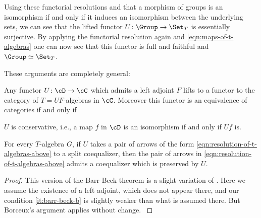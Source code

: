 \documentclass[leqno,oneside,english]{elsarticle}
\begin{document}
Using these functorial resolutions and that a morphism of groups is an
isomorphism if and only if it induces an isomorphism between the
underlying sets, we can see that the lifted functor $U\colon \Group
\rightarrow \Set_{T}$ is essentially surjective. By applying the
functorial resolution again and \eqref{eqn:maps-of-t-algebras} one can
now see that this functor is full and faithful and $\Group \simeq \Set_T$.

These arguments are completely general: 
\begin{thm}\label{thm:monadicity}
  Any functor $U\colon\cD\rightarrow \cC$ which admits a left adjoint
  $F$ lifts to a functor to the category of $T=UF$-algebras in $\cC$.
  Moreover this functor is an equivalence of categories if and only if
  \begin{hypothenumerate}
  \item \label{it:barr-beck-a} $U$ is conservative, i.e., a map
    $f$ in $\cD$ is an isomorphism if and only if $Uf$ is.
  \item \label{it:barr-beck-b} For every $T$-algebra $G$, if $U$ takes a pair of arrows of the
    form \eqref{eqn:resolution-of-t-algebras-above} to a split coequalizer, then the pair
    of arrows in \eqref{eqn:resolution-of-t-algebras-above} admits a
    coequalizer which is preserved by $U$.
  \end{hypothenumerate}
\end{thm}
\begin{proof}
  This version of the Barr-Beck theorem is a slight variation of
  \cite[Thm.~4.4.4]{Bor94a}. Here we assume the existence of a left adjoint,
  which does not appear there, and our condition \eqref{it:barr-beck-b} is
  slightly weaker than what is assumed there.  But Borceux's
  argument applies without change.
  {{\ifshowsaveblocks
{}
\fi}}{}
\end{proof}
\end{document}
